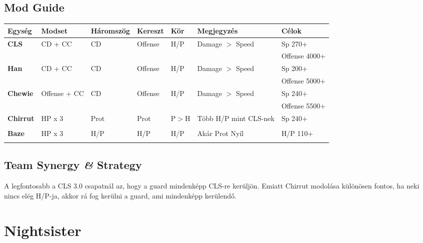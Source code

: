 \documentclass[11pt]{report}
\begin{document}
\section{Mod Guide}
\begin{center}
    \begin{tabular}{|l | l | l | l | l | l | l |}
        \hline
        Egység & Modset & Háromszög & Kereszt & Kör & Megjegyzés & Célok\\ \hline
        \textbf{CLS} & CD + CC & CD & Offense & H/P & Damage $>$ Speed & Sp 270+\\
        &  &  &  &  &  & Offense 4000+\\ \hline
        \textbf{Han} & CD + CC & CD & Offense & H/P & Damage $>$ Speed & Sp 200+\\
        &  &  &  &  &  & Offense 5000+\\ \hline
        \textbf{Chewie} & Offense + CC & CD & Offense & H/P & Damage $>$ Speed & Sp 240+\\ 
        &  &  &  &  &  & Offense 5500+\\ \hline
        \textbf{Chirrut} & HP x 3 & Prot & Prot & P$>$H & Több H/P mint CLS-nek & Sp 240+\\
        &  &  &  &  &  & \\ \hline
        \textbf{Baze} & HP x 3 & H/P & H/P & H/P & Akár Prot Nyíl & H/P 110+\\
        &  &  &  &  &  & \\ \hline
    \end{tabular}
\end{center}
\section{Team Synergy \textit{\&} Strategy}
A legfontosabb a CLS 3.0 csapatnál az, hogy a guard mindenképp CLS-re kerüljön. Emiatt Chirrut modolása különösen fontos, ha neki nincs elég H/P-ja, akkor rá fog kerülni a guard, ami mindenképp kerülendő.


\chapter{Nightsister}
\end{document}
